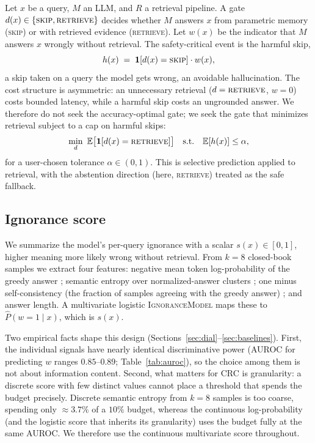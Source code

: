 \documentclass[a4paper,fleqn]{cas-dc}
\begin{document}
Let $x$ be a query, $M$ an LLM, and $R$ a retrieval pipeline. A gate
$d(x)\in\{\textsc{skip},\textsc{retrieve}\}$ decides whether $M$ answers $x$
from parametric memory (\textsc{skip}) or with retrieved evidence
(\textsc{retrieve}). Let $w(x)$ be the indicator that $M$ answers $x$ wrongly
without retrieval. The safety-critical event is the harmful skip,
\begin{equation}
h(x)\;=\;\mathbf 1[d(x)=\textsc{skip}]\cdot w(x),
\end{equation}
a skip taken on a query the model gets wrong, an avoidable hallucination. The
cost structure is asymmetric: an unnecessary retrieval ($d=\textsc{retrieve}$,
$w=0$) costs bounded latency, while a harmful skip costs an ungrounded answer.
We therefore do not seek the accuracy-optimal gate; we seek the gate that
minimizes retrieval subject to a cap on harmful skips:
\begin{equation}\label{eq:objective}
\min_{d}\ \mathbb E\big[\mathbf 1[d(x)=\textsc{retrieve}]\big]
\quad\text{s.t.}\quad \mathbb E[h(x)]\le\alpha,
\end{equation}
for a user-chosen tolerance $\alpha\in(0,1)$. This is selective prediction
\citep{geifman2017selective} applied to retrieval, with the abstention direction
(here, \textsc{retrieve}) treated as the safe fallback.

\subsection{Ignorance score}\label{sec:score}

We summarize the model's per-query ignorance with a scalar $s(x)\in[0,1]$,
higher meaning more likely wrong without retrieval. From $k=8$ closed-book
samples we extract four features: negative mean token log-probability of the
greedy answer \citep{kadavath2022know}; semantic entropy over
normalized-answer clusters \citep{kuhn2023semantic}; one minus self-consistency
(the fraction of samples agreeing with the greedy answer)
\citep{wang2023selfconsistency}; and answer length. A multivariate logistic
\textsc{IgnoranceModel} maps these to $\hat P(w=1\mid x)$, which is $s(x)$.

Two empirical facts shape this design (Sections~\ref{sec:dial}--\ref{sec:baselines}).
First, the individual signals have nearly identical discriminative power
(AUROC for predicting $w$ ranges $0.85$--$0.89$; Table~\ref{tab:auroc}), so the
choice among them is not about information content. Second, what matters
for CRC is granularity: a discrete score with few distinct values cannot
place a threshold that spends the budget precisely. Discrete semantic entropy
from $k=8$ samples is too coarse, spending only $\approx3.7\%$ of a $10\%$
budget, whereas the continuous log-probability (and the logistic score that
inherits its granularity) uses the budget fully at the same AUROC. We therefore
use the continuous multivariate score throughout.
\end{document}
